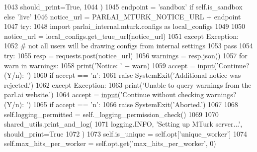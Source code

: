 \begin{DoxyCode}
{{{1043                 should\_print=\textcolor{keyword}{True},
1044             )
1045             endpoint = \textcolor{stringliteral}{'sandbox'} \textcolor{keywordflow}{if} self.is\_sandbox \textcolor{keywordflow}{else} \textcolor{stringliteral}{'live'}
1046             notice\_url = PARLAI\_MTURK\_NOTICE\_URL + endpoint
1047             \textcolor{keywordflow}{try}:
1048                 \textcolor{keyword}{import} parlai\_internal.mturk.configs \textcolor{keyword}{as} local\_configs
1049 
1050                 notice\_url = local\_configs.get\_true\_url(notice\_url)
1051             \textcolor{keywordflow}{except} Exception:
1052                 \textcolor{comment}{# not all users will be drawing configs from internal settings}
1053                 \textcolor{keywordflow}{pass}
1054             \textcolor{keywordflow}{try}:
1055                 resp = requests.post(notice\_url)
1056                 warnings = resp.json()
1057                 \textcolor{keywordflow}{for} warn \textcolor{keywordflow}{in} warnings:
1058                     print(\textcolor{stringliteral}{'Notice: '} + warn)
1059                     accept = \hyperlink{namespaceparlai_1_1mturk_1_1core_1_1dev_1_1test_1_1test__full__system_a1e1817cd65688fb90f827834d1fb4567}{input}(\textcolor{stringliteral}{'Continue? (Y/n): '})
1060                     \textcolor{keywordflow}{if} accept == \textcolor{stringliteral}{'n'}:
1061                         \textcolor{keywordflow}{raise} SystemExit(\textcolor{stringliteral}{'Additional notice was rejected.'})
1062             \textcolor{keywordflow}{except} Exception:
1063                 print(\textcolor{stringliteral}{'Unable to query warnings from the parl.ai website.'})
1064                 accept = \hyperlink{namespaceparlai_1_1mturk_1_1core_1_1dev_1_1test_1_1test__full__system_a1e1817cd65688fb90f827834d1fb4567}{input}(\textcolor{stringliteral}{'Continue without checking warnings? (Y/n): '})
1065                 \textcolor{keywordflow}{if} accept == \textcolor{stringliteral}{'n'}:
1066                     \textcolor{keywordflow}{raise} SystemExit(\textcolor{stringliteral}{'Aborted.'})
1067 
1068         self.logging\_permitted = self.\_logging\_permission\_check()
1069 
1070         shared\_utils.print\_and\_log(
1071             logging.INFO, \textcolor{stringliteral}{'Setting up MTurk server...'}, should\_print=\textcolor{keyword}{True}
1072         )
1073         self.is\_unique = self.opt[\textcolor{stringliteral}{'unique\_worker'}]
1074         self.max\_hits\_per\_worker = self.opt.get(\textcolor{stringliteral}{'max\_hits\_per\_worker'}, 0)
}}}
\end{DoxyCode}
